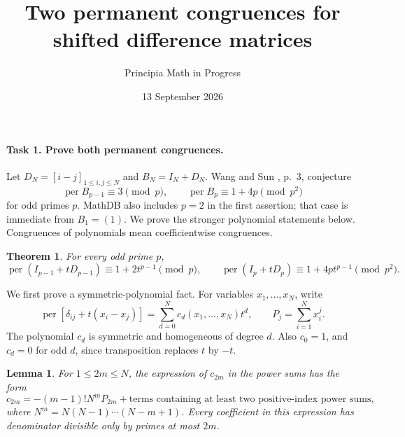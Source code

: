\documentclass[10pt]{article}
\title{Two permanent congruences for shifted difference matrices}
\author{Principia Math in Progress}
\date{13 September 2026}
\newtheorem{theorem}{Theorem}
\newtheorem{lemma}{Lemma}
\newcommand{\per}{\operatorname{per}}
\newcommand{\fall}[2]{#1^{\underline{#2}}}
\begin{document}
\maketitle

\paragraph{Task 1. Prove both permanent congruences.}
Let \(D_N=[i-j]_{1\le i,j\le N}\) and \(B_N=I_N+D_N\).
Wang and Sun \cite{WS}, p.~3, conjecture
\[
 \per B_{p-1}\equiv3\pmod p,\qquad
 \per B_p\equiv1+4p\pmod{p^2}
\]
for odd primes \(p\). MathDB also includes \(p=2\) in the first
assertion; that case is immediate from \(B_1=(1)\).
We prove the stronger polynomial statements below. Congruences of
polynomials mean coefficientwise congruences.

\begin{theorem}\label{main}
For every odd prime \(p\),
\[
 \per(I_{p-1}+tD_{p-1})\equiv1+2t^{p-1}\pmod p,
 \qquad
 \per(I_p+tD_p)\equiv1+4pt^{p-1}\pmod{p^2}.
\]
\end{theorem}

We first prove a symmetric-polynomial fact. For variables
\(x_1,\ldots,x_N\), write
\[
 \per[\delta_{ij}+t(x_i-x_j)]
 =\sum_{d=0}^N c_d(x_1,\ldots,x_N)t^d,
 \qquad P_j=\sum_{i=1}^N x_i^j.
\]
The polynomial \(c_d\) is symmetric and homogeneous of degree \(d\).
Also \(c_0=1\), and \(c_d=0\) for odd \(d\), since transposition
replaces \(t\) by \(-t\).

\begin{lemma}\label{linear}
For \(1\le2m\le N\), the expression of \(c_{2m}\) in the power sums
has the form
\[
 c_{2m}=-(m-1)!\fall{N}{m}P_{2m}
    +\text{terms containing at least two positive-index power sums},
\]
where \(\fall{N}{m}=N(N-1)\cdots(N-m+1)\).
Every coefficient in this expression has denominator divisible only
by primes at most \(2m\).
\end{lemma}
\end{document}
